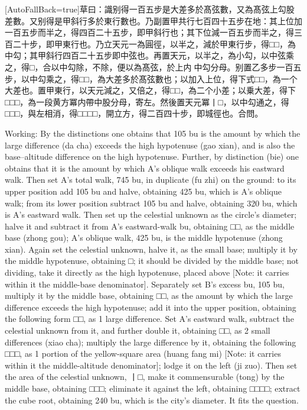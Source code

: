 \documentclass[11pt]{article}
\newcommand{\zhsmall}{\footnotesize\color{black!70}}
\newcommand{\unitlabel}[1]{\marginpar{\raggedleft\tiny\color{gray}#1}}
\newenvironment{unitzh}{\par\CJKfontspec{Noto Serif CJK SC}[AutoFallBack=true]\large\linespread{1.25}\selectfont}{\par}
\newenvironment{uniten}{\par\small\color{black!85}}{\par\medskip}
\begin{document}
\begin{unitzh}\unitlabel{ceyuan-018.5}草曰：識别得一百五步是大差多於髙弦數，又為髙弦上勾股差數。又别得是甲斜行多於東行數也。乃副置甲共行七百四十五步在地：其上位加一百五步而半之，得四百二十五步，即甲斜行也；其下位減一百五步而半之，得三百二十步，即甲東行也。乃立天元一為圓徑，以半之，減於甲東行步，得□□，為中勾；其甲斜行四百二十五步即中弦也。再置天元，以半之，為小勾，以中弦乘之，得□，合以中勾除，不除，便以為髙弦，於上{\zhsmall 内𢃄中勾分母}。别置乙多步一百五步，以中勾乘之，得□□，為大差多於髙弦數也；以加入上位，得下式□□，為一个大差也。置甲東行，以天元減之，又倍之，得□□，為二个小差；以乗大差，得下□□□，為一段黄方冪{\zhsmall 内帶中股分母}，寄左。然後置天元冪丨□，以中勾通之，得□□□，與左相消，得□□□□，開立方，得二百四十步，即城徑也。合問。\end{unitzh}
\begin{uniten}Working: By the distinctions one obtains that 105 bu is the amount by which the large difference (da cha) exceeds the high hypotenuse (gao xian), and is also the base–altitude difference on the high hypotenuse. Further, by distinction (bie) one obtains that it is the amount by which A's oblique walk exceeds his eastward walk. Then set A's total walk, 745 bu, in duplicate (fu zhi) on the ground: to its upper position add 105 bu and halve, obtaining 425 bu, which is A's oblique walk; from its lower position subtract 105 bu and halve, obtaining 320 bu, which is A's eastward walk. Then set up the celestial unknown as the circle's diameter; halve it and subtract it from A's eastward-walk bu, obtaining □□, as the middle base (zhong gou); A's oblique walk, 425 bu, is the middle hypotenuse (zhong xian). Again set the celestial unknown, halve it, as the small base; multiply it by the middle hypotenuse, obtaining □; it should be divided by the middle base; not dividing, take it directly as the high hypotenuse, placed above [Note: it carries within it the middle-base denominator]. Separately set B's excess bu, 105 bu, multiply it by the middle base, obtaining □□, as the amount by which the large difference exceeds the high hypotenuse; add it into the upper position, obtaining the following form □□, as 1 large difference. Set A's eastward walk, subtract the celestial unknown from it, and further double it, obtaining □□, as 2 small differences (xiao cha); multiply the large difference by it, obtaining the following □□□, as 1 portion of the yellow-square area (huang fang mi) [Note: it carries within it the middle-altitude denominator]; lodge it on the left (ji zuo). Then set the area of the celestial unknown, 丨□, make it commensurable (tong) by the middle base, obtaining □□□; eliminate it against the left, obtaining □□□□; extract the cube root, obtaining 240 bu, which is the city's diameter. It fits the question.\end{uniten}
\end{document}
